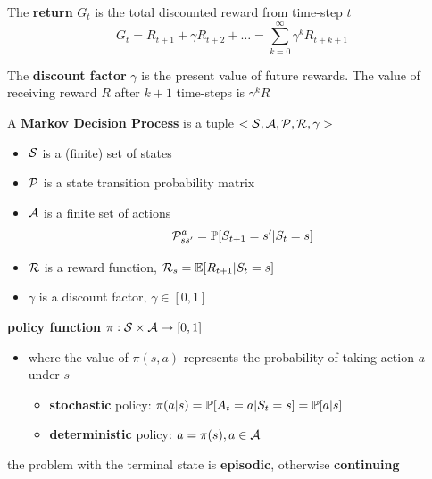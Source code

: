 \documentclass[11pt]{article}
\begin{document}
\begin{definition}
The \textbf{return} $G_t$ is the total discounted reward from time-step $t$
\begin{equation*}
G_t=R_{t+1}+\gamma R_{t+2}+\dots=\displaystyle\sum_{k=0}^\infty\gamma^kR_{t+k+1}
\end{equation*}
\end{definition}
The \textbf{discount factor} \(\gamma\) is the present value of future rewards. The
value of receiving reward \(R\) after \(k+1\) time-steps is \(\gamma^kR\)

\begin{definition}
A \textbf{Markov Decision Process} is a tuple $<\cals, \cala,\calp,\calr,\gamma>$
\begin{itemize}
\item $\cals$ is a (finite) set of states
\item $\calp$ is a state transition probability matrix
\item $\cala$ is a finite set of actions
\begin{equation*}
\calp_{ss'}^a=\P[S_{t+1}=s'|S_t=s]
\end{equation*}
\item $\calr$ is a reward function, $\calr_s=\E[R_{t+1}|S_t=s]$
\item $\gamma$ is a discount factor, $\gamma\in[0,1]$
\end{itemize}
\end{definition}

\textbf{policy function} \(\pi:\cals\times\cala\to[0,1]\) 
\begin{itemize}
\item where the value of \(\pi(s,a)\) represents the probability of taking action
\(a\) under \(s\) 
\begin{itemize}
\item \textbf{stochastic} policy: \(\pi(a|s)=\P[A_t=a|S_t=s]=\P[a|s]\)
\item \textbf{deterministic} policy: \(a=\pi(s), a\in\cala\)
\end{itemize}
\end{itemize}


the problem with the terminal state is \textbf{episodic}, otherwise \textbf{continuing}
\end{document}
